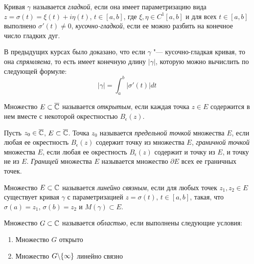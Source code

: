 \begin{definition}
	Кривая $\gamma$ называется \textit{гладкой}, если она имеет параметризацию вида $z = \sigma(t) = \xi(t) + i\eta(t)$, $t \in [a, b]$, где $\xi, \eta \in C^{1}[a, b]$ и для всех $t \in [a, b]$ выполнено $\sigma'(t) \ne 0$, \textit{кусочно-гладкой}, если ее можно разбить на конечное число гладких дуг.
\end{definition}

\begin{note}
	В предыдущих курсах было доказано, что если $\gamma$ "--- кусочно-гладкая кривая, то она \textit{спрямляема}, то есть имеет конечную длину $|\gamma|$, которую можно вычислить по следующей формуле:
	\[|\gamma| = \int_a^b|\sigma'(t)|dt\]
\end{note}

\begin{note}
	Множество $E \subset \overline{\mathbb{C}}$ называется \textit{открытым}, если каждая точка $z \in E$ содержится в нем вместе с некоторой окрестностью $B_\epsilon(z)$.
\end{note}

\begin{definition}
	Пусть $z_0 \in \overline{\mathbb{C}}$, $E \subset \overline{\mathbb{C}}$. Точка $z_0$ называется \textit{предельной точкой} множества $E$, если любая ее окрестность $B_\epsilon(z)$ содержит точку из множества $E$, \textit{граничной точкой} множества $E$, если любая ее окрестность $B_\epsilon(z)$ содержит и точку из $E$, и точку не из $E$. \textit{Границей} множества $E$ называется множество $\partial E$ всех ее граничных точек.
\end{definition}

\begin{definition}
	Множество $E \subset \mathbb{C}$ называется \textit{линейно связным}, если для любых точек $z_1, z_2 \in E$ существует кривая $\gamma$ с параметризацией $z = \sigma(t)$, $t \in [a, b]$, такая, что $\sigma(a) = z_1$, $\sigma(b) = z_2$ и $M(\gamma) \subset E$.
\end{definition}

\begin{definition}
	Множество $G \subset \mathbb{C}$ называется \textit{областью}, если выполнены следующие условия:
	\begin{enumerate}
		\item Множество $G$ открыто
		\item Множество $G \backslash \{\infty\}$ линейно связно
	\end{enumerate}
\end{definition}

